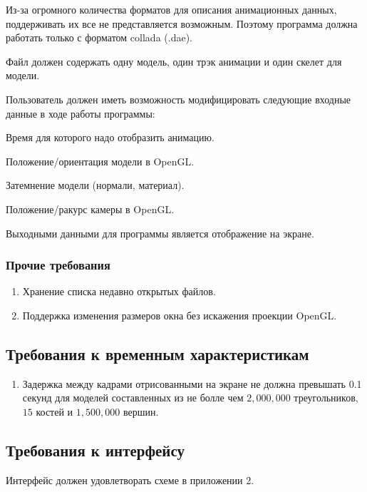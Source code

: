\begin{my_enumerate}
\item Из-за огромного количества форматов для описания анимационных данных, поддерживать их все не представляется возможным. Поэтому программа должна работать только с форматом collada (.dae).
\item Файл должен содержать одну модель, один трэк анимации и один скелет для модели.
\item Пользователь должен иметь возможность модифицировать следующие входные данные в ходе работы программы:
\begin{my_enumerate}
\item Время для которого надо отобразить анимацию.
\item Положение/ориентация модели в OpenGL.
\item Затемнение модели (нормали, материал).
\item Положение/ракурс камеры в OpenGL.
\end{my_enumerate}
\end{my_enumerate}

\medskip
Выходными данными для программы является отображение на экране.

\subsubsection{Прочие требования}
\begin{enumerate}
\item Хранение списка недавно открытых файлов.
\item Поддержка изменения размеров окна без искажения проекции OpenGL.
\end{enumerate}

\subsection{Требования к временным характеристикам}
\begin{enumerate}
\item Задержка между кадрами отрисованными на экране не должна превышать 0.1 секунд для моделей составленных из не болле чем $2,000,000$ треугольников, $15$ костей и $1,500,000$ вершин.
\end{enumerate}


\subsection{Требования к интерфейсу}
Интерфейс должен удовлетворать схеме в приложении 2.

